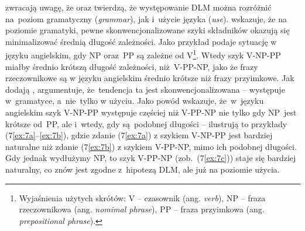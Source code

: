 \documentclass[licencjacka]{pracamgr_Kogni}
\begin{document}
    \citet{Przepiorkowski2023} zwracają uwagę, że \citet{FutrellEtAl2020} oraz \citet{Hawkins1994} twierdzą, że występowanie DLM można rozróżnić na~poziom gramatyczny (\textit{grammar}), jak i~użycie języka (\textit{use}). \citet{Hawkins1994} wskazuje, że na poziomie gramatyki, pewne skonwencjonalizowane szyki składników okazują się minimalizować średnią długość zależności.
    Jako przykład podaje sytuację w języku angielskim, gdy NP oraz~PP są zależne od V\footnote{Wyjaśnienia użytych skrótów: V -- czasownik (ang. \textit{verb}), NP -- fraza rzeczownikowa (ang. \textit{nomimal phrase}), PP -- fraza przyimkowa (ang. \textit{prepositional phrase}).}.
    Wtedy szyk V-NP-PP miałby średnio krótszą długość zależności, niż~V-PP-NP, jako że frazy rzeczownikowe są w języku angielskim średnio krótsze niż frazy przyimkowe.
    Jak dodają \citet{Przepiorkowski2023}, \citet{Hawkins1994} argumentuje, że~tendencja ta jest skonwencjonalizowana -- występuje w~gramatyce, a~nie~tylko w użyciu.
    Jako powód wskazuje, że~w~języku angielskim szyk V-NP-PP występuje częściej niż V-PP-NP nie tylko gdy NP~jest krótsze od~PP, ale i~wtedy, gdy są~podobnej długości -- ilustrują to przykłady (7\ref{ex:7a}--\ref{ex:7b}), gdzie zdanie (7\ref{ex:7a}) z szykiem V-NP-PP jest bardziej naturalne niż zdanie (7\ref{ex:7b}) z szykiem V-PP-NP, mimo ich podobnej długości.
    Gdy jednak wydłużymy NP, to szyk V-PP-NP (zob.~(7\ref{ex:7c})) staje się bardziej naturalny, co znów jest zgodne z~hipotezą DLM, ale już na poziomie użycia.
\end{document}
